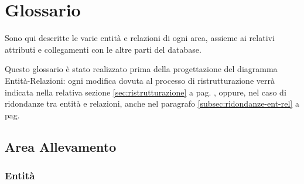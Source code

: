 \documentclass[12pt,a4paper]{article}
\begin{document}
\section{Glossario}
Sono qui descritte le varie entità e relazioni di ogni area, assieme ai relativi attributi e collegamenti con le altre parti del database.

Questo glossario è stato realizzato prima della progettazione del diagramma Entità-Relazioni: ogni modifica dovuta al processo di ristrutturazione verrà indicata nella relativa sezione \ref{sec:ristrutturazione} a pag. \pageref{sec:ristrutturazione}, oppure, nel caso di ridondanze tra entità e relazioni, anche nel paragrafo \ref{subsec:ridondanze-ent-rel} a pag. \pageref{subsec:ridondanze-ent-rel}
\subsection{Area Allevamento}
\subsubsection{Entità}
\label{Allevamento Entita}
\end{document}
